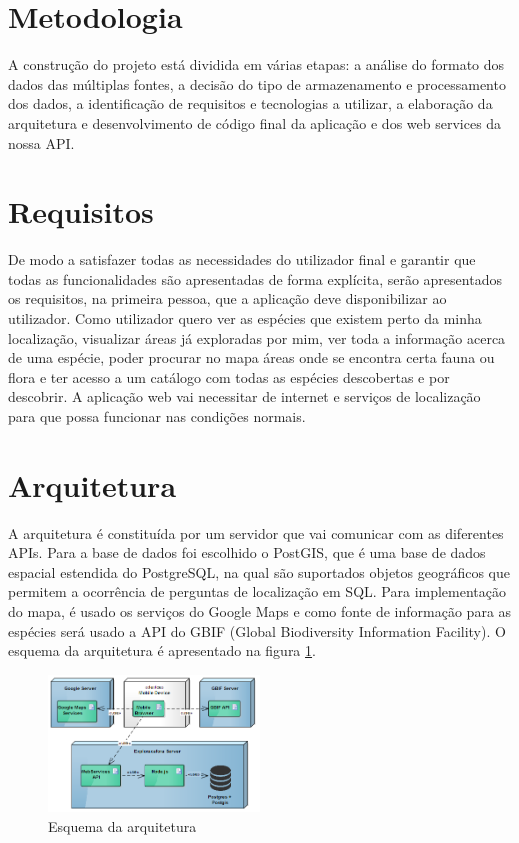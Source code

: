 \documentclass[twocolumn,twoside,11pt,a4paper]{article}
\begin{document}
\section{Metodologia}\label{sec:metod}
A construção do projeto está dividida em várias etapas: a análise do formato dos dados das múltiplas fontes, a decisão do tipo de armazenamento e processamento dos dados, a identificação de requisitos e tecnologias a utilizar, a elaboração da arquitetura e desenvolvimento de código final da aplicação e dos web services da nossa API.


\section{Requisitos}\label{sec:requisitos}
De modo a satisfazer todas as necessidades do utilizador final e garantir que todas as funcionalidades são apresentadas de forma explícita, serão apresentados os requisitos, na primeira pessoa, que a aplicação deve disponibilizar ao utilizador.
 Como utilizador quero ver as espécies que existem perto da minha localização, visualizar áreas já exploradas por mim, ver toda a informação acerca de uma espécie, poder procurar no mapa áreas onde se encontra certa fauna ou flora e ter acesso a um catálogo com todas as espécies descobertas e por descobrir.
	A aplicação web vai necessitar de internet e serviços de localização para que possa funcionar nas condições normais. 


\section{Arquitetura}\label{sec:arquitetura}
A arquitetura é constituída por um servidor que vai comunicar com as diferentes APIs. Para a base de dados foi escolhido o PostGIS, que é uma base de dados espacial estendida do PostgreSQL, na qual são suportados objetos geográficos que permitem a ocorrência de perguntas de localização em SQL. Para implementação do mapa, é usado os serviços do Google Maps e como fonte de informação para as espécies será usado a API do GBIF (Global Biodiversity Information Facility). O esquema da arquitetura é apresentado na figura \ref{fig:arq}.

\begin{figure}[ht!]
	\begin{center}
		\leavevmode
		\includegraphics[width=0.50\textwidth]{Deployment_Model}
		\caption{Esquema da arquitetura}
		\label{fig:arq}
	\end{center}
\end{figure} 
\end{document}
